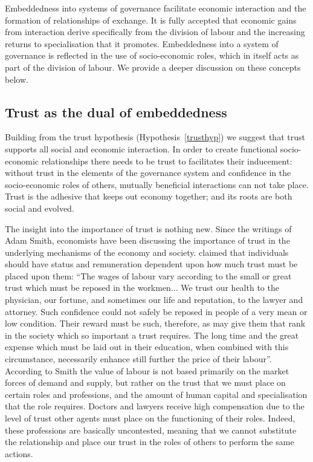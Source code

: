\begin{subappendices}
\medskip \noindent Embeddedness into systems of governance facilitate economic interaction and the formation of relationships of exchange. It is fully accepted that economic gains from interaction derive specifically from the division of labour and the increasing returns to specialisation that it promotes. Embeddedness into a system of governance is reflected in the use of socio-economic roles, which in itself acts as part of the division of labour. We provide a deeper discussion on these concepts below.

\subsection{Trust as the dual of embeddedness}

Building from the trust hypothesis (Hypothesis~\ref{trusthyp}) we suggest that trust supports all social and economic interaction. In order to create functional socio-economic relationships there needs to be trust to facilitates their inducement: without trust in the elements of the governance system and confidence in the socio-economic roles of others, mutually beneficial interactions can not take place. Trust is the adhesive that keeps out economy together; and its roots are both social and evolved.

The insight into the importance of trust is nothing new. Since the writings of Adam Smith, economists have been discussing the importance of trust in the underlying mechanisms of the economy and society. \citet[p.~91]{Smith1776} claimed that individuals should have status and remuneration dependent upon how much trust must be placed upon them: ``The wages of labour vary according to the small or great trust which must be reposed in the workmen... We trust our health to the physician, our fortune, and sometimes our life and reputation, to the lawyer and attorney. Such confidence could not safely be reposed in people of a very mean or low condition. Their reward must be such, therefore, as may give them that rank in the society which so important a trust requires. The long time and the great expense which must be laid out in their education, when combined with this circumstance, necessarily enhance still further the price of their labour''. According to Smith the value of labour is not based primarily on the market forces of demand and supply, but rather on the trust that we must place on certain roles and professions, and the amount of human capital and specialisation that the role requires. Doctors and lawyers receive high compensation due to the level of trust other agents must place on the functioning of their roles. Indeed, these professions are basically uncontested, meaning that we cannot substitute the relationship and place our trust in the roles of others to perform the same actions.


\end{subappendices}
